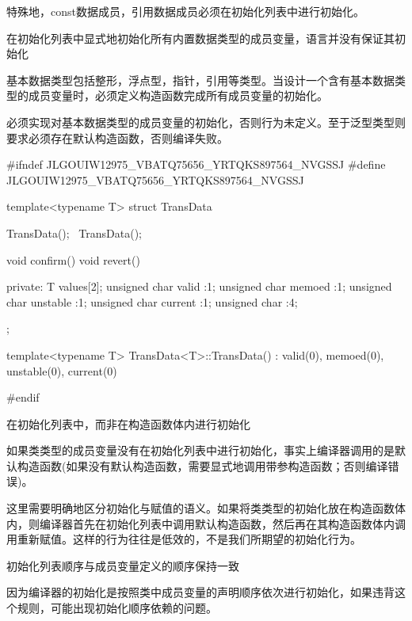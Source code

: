 \begin{content}
特殊地，const数据成员，引用数据成员必须在初始化列表中进行初始化。

\begin{regulation}
在初始化列表中显式地初始化所有内置数据类型的成员变量，\cpp{}语言并没有保证其初始化
\end{regulation}

基本数据类型包括整形，浮点型，指针，引用等类型。当设计一个含有基本数据类型的成员变量时，必须定义构造函数完成所有成员变量的初始化。

必须实现对基本数据类型的成员变量的初始化，否则行为未定义。至于泛型类型则要求必须存在默认构造函数，否则编译失败。

\begin{leftbar}
\begin{c++}[caption={base/TransData.h}]
#ifndef JLGOUIW12975_VBATQ75656_YRTQKS897564_NVGSSJ
#define JLGOUIW12975_VBATQ75656_YRTQKS897564_NVGSSJ

template<typename T>
struct TransData
{
   TransData();
   ~TransData();

   void confirm()
   void revert()

private:
   T values[2];
   unsigned char valid :1;
   unsigned char memoed :1;
   unsigned char unstable :1;
   unsigned char current :1;
   unsigned char :4;
};

template<typename T>
TransData<T>::TransData()
  : valid(0), memoed(0), unstable(0), current(0)
{
}

#endif
\end{c++}
\end{leftbar}

\begin{regulation}
在初始化列表中，而非在构造函数体内进行初始化
\end{regulation}

如果类类型的成员变量没有在初始化列表中进行初始化，事实上编译器调用的是默认构造函数(如果没有默认构造函数，需要显式地调用带参构造函数；否则编译错误)。

这里需要明确地区分初始化与赋值的语义。如果将类类型的初始化放在构造函数体内，则编译器首先在初始化列表中调用默认构造函数，然后再在其构造函数体内调用重新赋值。这样的行为往往是低效的，不是我们所期望的初始化行为。

\begin{regulation}
初始化列表顺序与成员变量定义的顺序保持一致
\end{regulation}

因为编译器的初始化是按照类中成员变量的声明顺序依次进行初始化，如果违背这个规则，可能出现初始化顺序依赖的问题。


\end{content}

